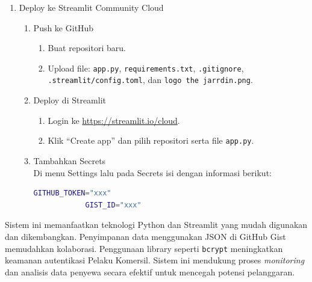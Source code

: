 \begin{enumerate}
\begin{enumerate}
\begin{enumerate}
\begin{lstlisting}[language=Python]
            if st.button("Simpan"):
                # Simpan data ke JSON/GitHub Gist logic here
                pass
        \end{lstlisting}
        
        \begin{itemize}
          \item Komponen \textit{checkbox} untuk pelanggaran dan waktu \textit{check-out} hanya tampil saat edit data.
          \item Data yang dimasukkan disimpan ke file \texttt{rentals.json} di GitHub Gist.
        \end{itemize}
        
      \end{enumerate}
      
      \item {Deploy ke Streamlit Community Cloud}
      \begin{enumerate}
        \item {Push ke GitHub}
        \begin{enumerate}
          \item Buat repositori baru.
          \item Upload file: \texttt{app.py}, \texttt{requirements.txt}, \texttt{.gitignore}, \texttt{.streamlit/config.toml}, dan \texttt{logo the jarrdin.png}.
        \end{enumerate}
        
        \item {Deploy di Streamlit}
        \begin{enumerate}
          \item Login ke \url{https://streamlit.io/cloud}.
          \item Klik ``Create app'' dan pilih repositori serta file \texttt{app.py}.
        \end{enumerate}
        
        \item {Tambahkan Secrets}\\
        Di menu Settings lalu pada Secrets isi dengan informasi berikut:
        \begin{lstlisting}[language=Bash]
            GITHUB_TOKEN="xxx"
            GIST_ID="xxx"
        \end{lstlisting}
      \end{enumerate}
      
    \end{enumerate}
    
    Sistem \textit{} ini memanfaatkan teknologi Python dan Streamlit yang mudah digunakan dan dikembangkan. Penyimpanan data menggunakan JSON di GitHub Gist memudahkan kolaborasi. Penggunaan library seperti \texttt{bcrypt} meningkatkan keamanan autentikasi Pelaku Komersil. Sistem ini mendukung proses \textit{monitoring} dan analisis data penyewa secara efektif untuk mencegah potensi pelanggaran.


\end{enumerate}
